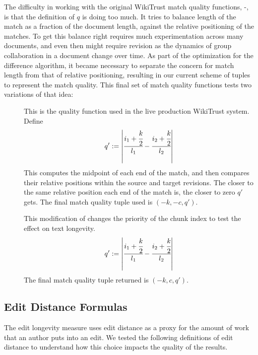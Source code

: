 The difficulty in working with the original WikiTrust
match quality functions, -,
is that the definition of $q$ is doing too much.
It tries to balance length of the match as a fraction
of the document length, against the relative positioning
of the matches.
To get this balance right requires much experimentation across
many documents, and even then might require revision as
the dynamics of group collaboration in a document change over time.
As part of the  optimization for the
difference algorithm, it became necessary to separate the
concern for match length from that of relative positioning,
resulting in our current scheme of tuples to represent
the match quality.
This final set of match quality functions tests two variations
of that idea:
%
\begin{description}

\item[] This is the quality function used in the
    live production WikiTrust system.
    Define
    \begin{equation*}
    q' := \left|\cfrac{ i_1 + \cfrac{k}{2} }{l_1}
            - \cfrac{ i_2 + \cfrac{k}{2} }{l_2} \right|
    \end{equation*}
    This computes the midpoint of each end of the match,
    and then compares their relative positions within
    the source and target revisions.
    The closer to the same relative position each end of
    the match is, the closer to zero $q'$ gets.
    The final match quality tuple used is $(-k, -c, q')$.

\item[] This modification of 
    changes the priority of the chunk index to test
    the effect on text longevity.
    \begin{equation*}
    q' := \left|\cfrac{ i_1 + \cfrac{k}{2} }{l_1}
            - \cfrac{ i_2 + \cfrac{k}{2} }{l_2} \right|
    \end{equation*}
    The final match quality tuple returned is $(-k, c, q')$.

\end{description}

\subsection{Edit Distance Formulas}

The edit longevity measure uses edit distance as a proxy for the
amount of work that an author puts into an edit.
We tested the following definitions of edit distance to understand
how this choice impacts the quality of the results.

